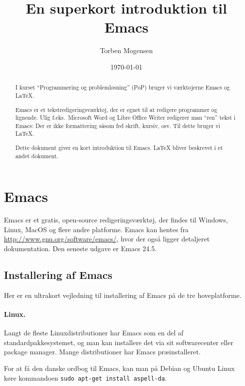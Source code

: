 \documentclass[a4paper]{article}
\begin{document}
\title{En superkort introduktion til Emacs}

\author{Torben Mogensen}
\date{\today}

\maketitle

\begin{abstract}
I kurset ``Programmering og problemløsning'' (PoP) bruger vi
værk\-tøj\-er\-ne Emacs og \LaTeX.

Emacs er et tekstredigeringsværktøj, der er egnet til at redigere
programmer og lignende.  Ulig f.eks.\ Microsoft Word og Libre Office
Writer redigerer man ``ren'' tekst i Emacs: Der er ikke formattering
såsom fed skrift, kursiv, osv.  Til dette bruger vi \LaTeX.

Dette dokument giver en kort introduktion til Emacs.  \LaTeX{} bliver
beskrevet i et andet dokument.
\end{abstract}

\tableofcontents


\section{Emacs}

Emacs er et gratis, open-source redigeringsværktøj, der findes til
Windows, Linux, MacOS og flere andre platforme.  Emacs kan hentes fra
\url{http://www.gnu.org/software/emacs/}, hvor der også ligger
detaljeret dokumentation.  Den seneste udgave er Emacs 24.5.

\subsection{Installering af Emacs}

Her er en ultrakort vejledning til installering af Emacs på de tre
hoveplatforme.

\paragraph{Linux.}

Langt de fleste Linuxdistributioner har Emacs som en del af
standardpakkesystemet, og man kan installere det via sit
softwarecenter eller package manager.  Mange distributioner har Emacs
præinstalleret.

For at få den danske ordbog til Emacs, kan man på Debian og Ubuntu
Linux køre kommandoen \texttt{sudo~apt-get~install~aspell-da}.
\end{document}
